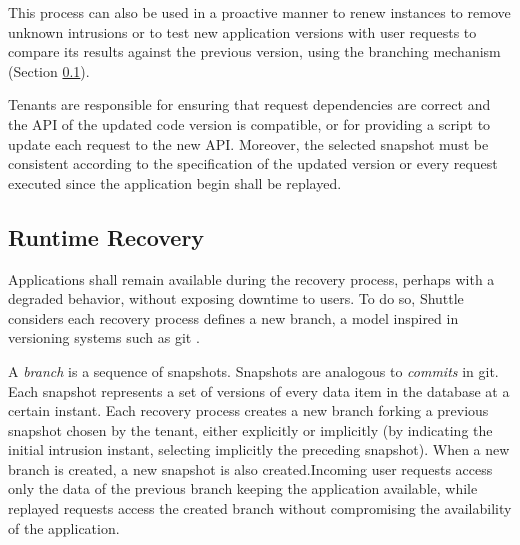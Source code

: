 This process can also be used in a proactive manner to renew instances to remove unknown intrusions \cite{Castro2002,Sousa2010} or to test new application versions with user requests to compare its results against the previous version, using the branching mechanism  (Section \ref{sec:arch:runtime_recovery}).

Tenants are responsible for ensuring that request dependencies are correct and the {API} of the updated code version is compatible, or for providing a script to update each request to the new \ac{API}. Moreover, the selected snapshot must be consistent according to the specification of the updated version or every request executed since the application begin shall be replayed.



\subsection{Runtime Recovery}
\label{sec:arch:runtime_recovery}

Applications shall remain available during the recovery process, perhaps with a degraded behavior, without exposing downtime to users. To do so, Shuttle considers each recovery process defines a new branch, a model inspired in versioning systems such as git \cite{git}.

A \emph{branch} is a sequence of snapshots. Snapshots are analogous to \textit{commits} in git. Each snapshot represents a set of versions of every data item in the database at a certain instant. Each recovery process creates a new branch forking a previous snapshot chosen by the tenant, either explicitly or implicitly (by indicating the initial intrusion instant, selecting implicitly the preceding snapshot). When a new branch is created, a new snapshot is also created.Incoming user requests access only the data of the previous branch keeping the application available, while replayed requests access the created branch without compromising the availability of the application. 

